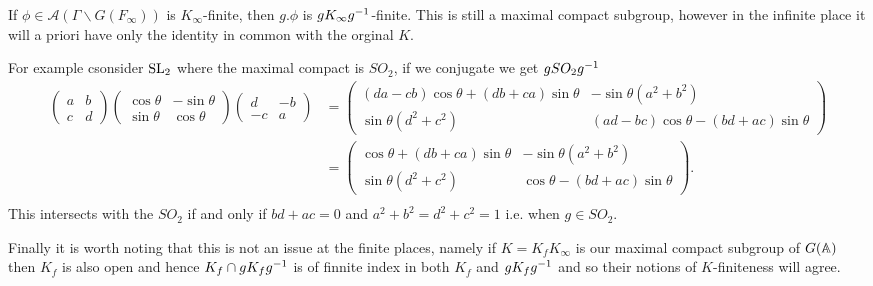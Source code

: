 \begin{example}
    If \(\phi\in \mathcal{A}(\Gamma \backslash G(F_\infty))\) is \(K_\infty\)-finite, then \(g.\phi\) is \(gK_\infty g^{-1}\)-finite. This is still a maximal compact subgroup, however in the infinite place it will a priori have only the identity in common with the orginal \(K\).

    For example csonsider \(\operatorname{SL}_2\) where the maximal compact is \(SO_2\), if we conjugate we get \(gSO_2g^{-1}\)
    \begin{align*}
        \begin{pmatrix}
            a & b\\
            c & d
        \end{pmatrix}
        \begin{pmatrix}
            \cos\theta & -\sin\theta \\
            \sin\theta & \cos\theta
        \end{pmatrix}
        \begin{pmatrix}
            d & -b\\
            -c & a
        \end{pmatrix} &=  \begin{pmatrix}
            (da - cb)\cos\theta + (db  + ca)\sin\theta & -\sin\theta( a^2+b^2)\\
            \sin\theta(d^2 + c^2) & ( ad  -bc)\cos\theta - (b d  + ac)\sin\theta
        \end{pmatrix}\\
        &=  \begin{pmatrix}
            \cos\theta + (db  + ca)\sin\theta & -\sin\theta( a^2+b^2)\\
            \sin\theta(d^2 + c^2) & \cos\theta - (b d  + ac)\sin\theta
        \end{pmatrix}.\\
    \end{align*}
    This intersects with the \(SO_2\) if and only if \(bd+ac = 0\) and \(a^2 + b^2 = d^2 + c^2 = 1\) i.e. when \(g\in SO_2\).

    Finally it is worth noting that this is not an issue at the finite places, namely if \(K = K_fK_\infty\) is our maximal compact subgroup of \(G(\A)\) then \(K_f\) is also open and hence \(K_f \cap gK_f g^{-1}\) is of finnite index in both \(K_f\) and \(gK_f g^{-1}\) and so their notions of \(K\)-finiteness will agree. 
\end{example}

